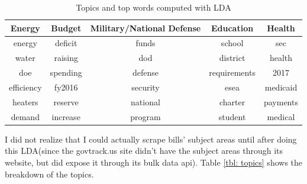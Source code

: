 \documentclass{article}
\begin{document}
\begin{table}[]
\centering
\vspace{-10pt}
\caption{\label{tbl: lda}Topics and top words computed with LDA}
\begin{tabular}{c c c c c}
\hline
Energy      & Budget    & Military/National Defense & Education & Health \\
\hline
energy      & deficit   & funds                     & school           & sec \\
water       & raising   & dod                       & district         & health \\
doe         & spending  & defense                   & requirements     & 2017 \\
efficiency  & fy2016    & security                  & esea             & medicaid \\
heaters     & reserve   & national                  & charter          & payments \\
demand      & increase  & program                   & student          & medical  \\
\hline
\end{tabular}
\end{table}
I did not realize that I could actually scrape bills' subject areas until after doing this LDA(since the govtrack.us site didn't have the subject areas through its website, but did expose it through its bulk data api). Table \ref{tbl: topics} shows the breakdown of the topics.
\end{document}
